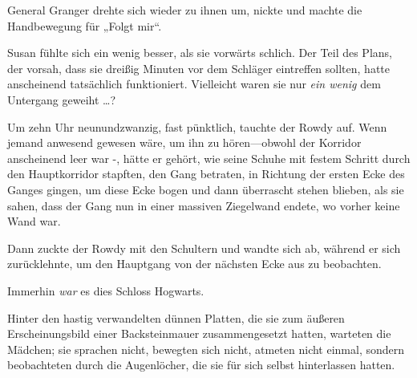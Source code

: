 General Granger drehte sich wieder zu ihnen um, nickte und machte die Handbewegung für „Folgt mir“.

Susan fühlte sich ein wenig besser, als sie vorwärts schlich. Der Teil des Plans, der vorsah, dass sie dreißig Minuten vor dem Schläger eintreffen sollten, hatte anscheinend tatsächlich funktioniert. Vielleicht waren sie nur \emph{ein wenig} dem Untergang geweiht …?

\later

Um zehn Uhr neunundzwanzig, fast pünktlich, tauchte der Rowdy auf. Wenn jemand anwesend gewesen wäre, um ihn zu hören—obwohl der Korridor anscheinend leer war -, hätte er gehört, wie seine Schuhe mit festem Schritt durch den Hauptkorridor stapften, den Gang betraten, in Richtung der ersten Ecke des Ganges gingen, um diese Ecke bogen und dann überrascht stehen blieben, als sie sahen, dass der Gang nun in einer massiven Ziegelwand endete, wo vorher keine Wand war.

Dann zuckte der Rowdy mit den Schultern und wandte sich ab, während er sich zurücklehnte, um den Hauptgang von der nächsten Ecke aus zu beobachten.

Immerhin \emph{war} es dies Schloss Hogwarts.

Hinter den hastig verwandelten dünnen Platten, die sie zum äußeren Erscheinungsbild einer Backsteinmauer zusammengesetzt hatten, warteten die Mädchen; sie sprachen nicht, bewegten sich nicht, atmeten nicht einmal, sondern beobachteten durch die Augenlöcher, die sie für sich selbst hinterlassen hatten.


